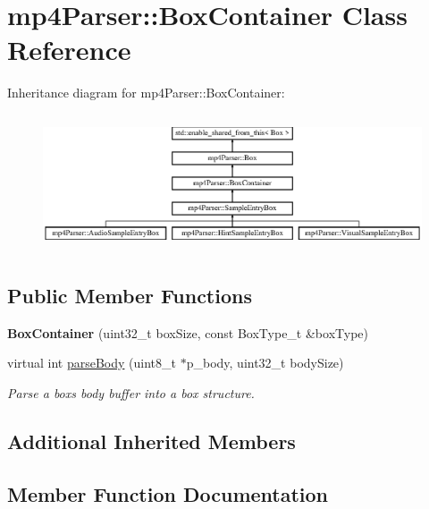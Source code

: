 \hypertarget{classmp4_parser_1_1_box_container}{}\section{mp4\+Parser\+::Box\+Container Class Reference}
\label{classmp4_parser_1_1_box_container}
Inheritance diagram for mp4\+Parser\+::Box\+Container\+:\begin{figure}[H]
\begin{center}
\leavevmode
\includegraphics[height=4.075692cm]{classmp4_parser_1_1_box_container}
\end{center}
\end{figure}
\subsection*{Public Member Functions}
\begin{DoxyCompactItemize}
\item 
\mbox{\label{classmp4_parser_1_1_box_container_aef0208e67feaee70a7882db0af35e37c}} 
{\bfseries Box\+Container} (uint32\+\_\+t box\+Size, const Box\+Type\+\_\+t \&box\+Type)
\item 
virtual int \mbox{\hyperlink{classmp4_parser_1_1_box_container_a84274dc2397087178ea6858971d399ee}{parse\+Body}} (uint8\+\_\+t $\ast$p\+\_\+body, uint32\+\_\+t body\+Size)
\begin{DoxyCompactList}\small\item\em Parse a box\textquotesingle{}s body buffer into a box structure. \end{DoxyCompactList}\end{DoxyCompactItemize}
\subsection*{Additional Inherited Members}


\subsection{Member Function Documentation}
\mbox{\label{classmp4_parser_1_1_box_container_a84274dc2397087178ea6858971d399ee}} 
